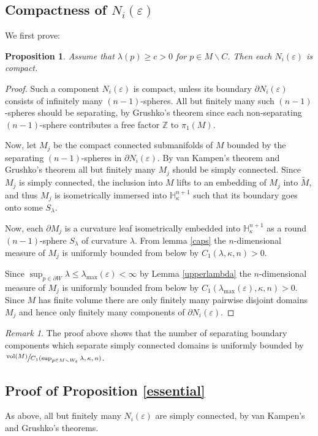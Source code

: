 \documentclass[JEP,XML,SOM,Unicode]{cedram}
\let\moins\smallsetminus
\DeclareMathOperator{\vol}{vol}
\newtheorem{proposition}[theorem]{Proposition}
\theoremstyle{definition}
\theoremstyle{remark}
\newtheorem{remark}[theorem]{Remark}
\numberwithin{equation}{section}
\begin{document}
\subsection{Compactness of $N_i(\varepsilon)$}
We first prove:
\begin{proposition}\label{compact}
Assume that $\lambda(p) \geq c >0$ for $p\in M\moins C$.
Then each $N_i(\varepsilon)$ is compact.
\end{proposition}
\begin{proof}
Such a component $N_i(\varepsilon)$ is compact, unless its boundary $\partial N_i(\varepsilon)$ consists of
infinitely many $(n-1)$-spheres.
All but finitely many such $(n-1)$-spheres should be separating, by
Grushko's theorem since each non-separating $(n-1)$-sphere contributes a free factor $\mathbb Z$
to $\pi_1(M)$.

Now, let $M_j$ be the compact connected submanifolds of $M$ bounded
by the separating $(n-1)$-spheres in $\partial N_i(\varepsilon)$. By van
Kampen's theorem and Grushko's theorem all but finitely many $M_j$
should be simply connected. Since $M_j$ is simply connected, the inclusion into $M$ lifts to
an embedding of $M_j$ into $\widetilde{M}$, and
thus $M_j$ is isometrically immersed into $\mathbb H_{\kappa}^{n+1}$ such that
its boundary goes onto some $S_{\lambda}$.

Now, each $\partial M_j$ is a
curvature leaf isometrically embedded
into $\mathbb H_{\kappa}^{n+1}$ as a round $(n-1)$-sphere $S_{\lambda}$
of curvature $\lambda$.
From lemma \ref{caps} the
$n$-dimensional measure of $M_j$ is uniformly bounded from below by
$C_1(\lambda,\kappa,n) >0$.

Since $\sup_{p\in \partial W}\lambda \leq \lambda_{\max}(\varepsilon) < \infty$ by Lemma \ref{upperlambda}
the $n$-dimensional measure of $M_j$ is uniformly bounded from below by
$C_1(\lambda_{\max}(\varepsilon),\kappa,n) >0$. Since $M$ has finite volume there are only
finitely many pairwise disjoint domains $M_j$ and hence only finitely many components of $\partial N_i(\varepsilon)$.
\end{proof}
\begin{remark}\label{separating}
The proof above shows that the
number of separating boundary components which separate
simply connected domains is uniformly bounded by
$\sfrac{\vol(M)}{C_1(\sup_{p\in M\moins W_{\varepsilon}}\lambda,\kappa,n)}$.
\end{remark}

\subsection{Proof of Proposition \ref{essential}}
As above, all but finitely many $N_i(\varepsilon)$ are simply connected, by van Kampen's and Grushko's theorems.
\end{document}
